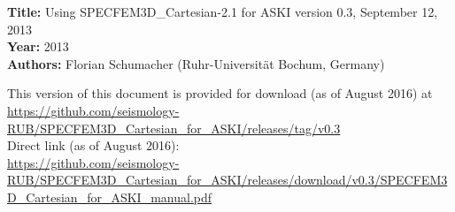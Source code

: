 {\bf Title: } Using SPECFEM3D\_Cartesian-2.1 for ASKI version 0.3, September 12, 2013\\
{\bf Year: } 2013\\
{\bf Authors: } Florian Schumacher (Ruhr-Universit\"at Bochum, Germany)

This version of this document is provided for download (as of August 2016) at\\
\url{https://github.com/seismology-RUB/SPECFEM3D_Cartesian_for_ASKI/releases/tag/v0.3}\\
Direct link (as of August 2016):\\
\url{https://github.com/seismology-RUB/SPECFEM3D_Cartesian_for_ASKI/releases/download/v0.3/SPECFEM3D_Cartesian_for_ASKI_manual.pdf}
